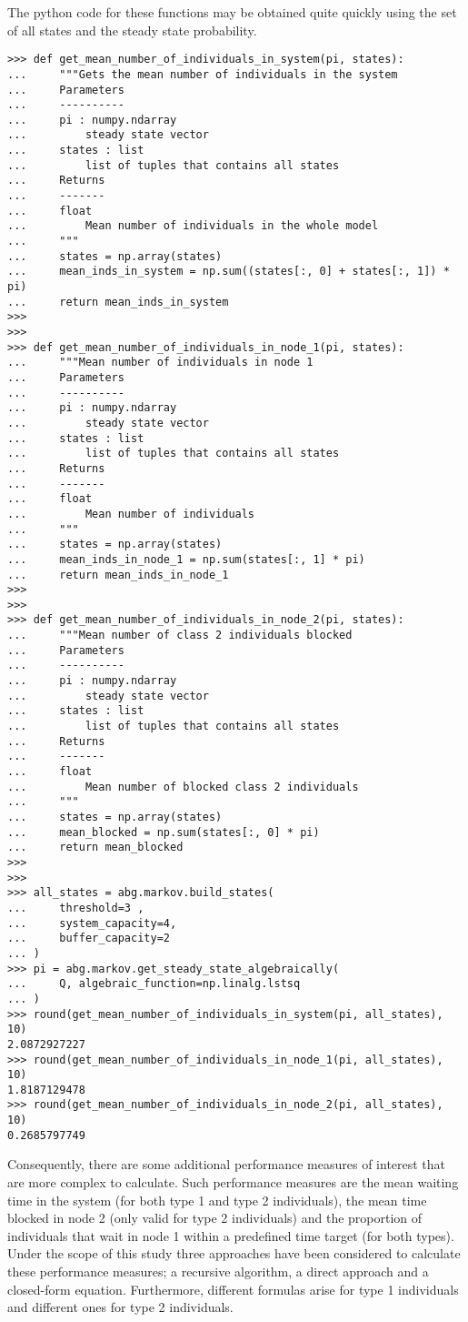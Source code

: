 The python code for these functions may be obtained quite quickly using the set
of all states and the steady state probability.

\begin{lstlisting}[style=pystyle]
>>> def get_mean_number_of_individuals_in_system(pi, states):
...     """Gets the mean number of individuals in the system
...     Parameters
...     ----------
...     pi : numpy.ndarray
...         steady state vector
...     states : list
...         list of tuples that contains all states
...     Returns
...     -------
...     float
...         Mean number of individuals in the whole model
...     """
...     states = np.array(states)
...     mean_inds_in_system = np.sum((states[:, 0] + states[:, 1]) * pi)
...     return mean_inds_in_system
>>>
>>>
>>> def get_mean_number_of_individuals_in_node_1(pi, states):
...     """Mean number of individuals in node 1
...     Parameters
...     ----------
...     pi : numpy.ndarray
...         steady state vector
...     states : list
...         list of tuples that contains all states
...     Returns
...     -------
...     float
...         Mean number of individuals
...     """
...     states = np.array(states)
...     mean_inds_in_node_1 = np.sum(states[:, 1] * pi)
...     return mean_inds_in_node_1
>>>
>>>
>>> def get_mean_number_of_individuals_in_node_2(pi, states):
...     """Mean number of class 2 individuals blocked
...     Parameters
...     ----------
...     pi : numpy.ndarray
...         steady state vector
...     states : list
...         list of tuples that contains all states
...     Returns
...     -------
...     float
...         Mean number of blocked class 2 individuals
...     """
...     states = np.array(states)
...     mean_blocked = np.sum(states[:, 0] * pi)
...     return mean_blocked
>>>
>>>
>>> all_states = abg.markov.build_states(
...     threshold=3 ,
...     system_capacity=4,
...     buffer_capacity=2
... )
>>> pi = abg.markov.get_steady_state_algebraically(
...     Q, algebraic_function=np.linalg.lstsq
... )
>>> round(get_mean_number_of_individuals_in_system(pi, all_states), 10)
2.0872927227
>>> round(get_mean_number_of_individuals_in_node_1(pi, all_states), 10)
1.8187129478
>>> round(get_mean_number_of_individuals_in_node_2(pi, all_states), 10)
0.2685797749

\end{lstlisting}


Consequently, there are some additional performance measures of interest that
are more complex to calculate.
Such performance measures are the mean waiting time in the system (for both
type 1 and type 2 individuals), the mean time blocked in node 2 (only
valid for type 2 individuals) and the proportion of individuals that wait in
node 1 within a predefined time target (for both types).
Under the scope of this study three approaches have been considered to calculate
these performance measures; a recursive algorithm, a direct approach and
a closed-form equation. 
Furthermore, different formulas arise for type 1 individuals and different
ones for type 2 individuals.


